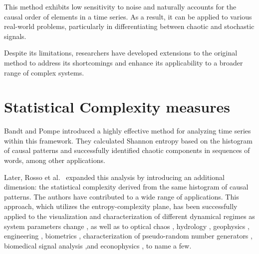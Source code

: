 This method exhibits low sensitivity to noise and naturally accounts for the causal order of elements in a time series. As a result, it can be applied to various real-world problems, particularly in differentiating between chaotic and stochastic signals.

Despite its limitations, researchers have developed extensions to the original method to address its shortcomings and enhance its applicability to a broader range of complex systems.

\section{Statistical Complexity measures} \label{Sec:BackgroundKnowledge}

Bandt and Pompe introduced a highly effective method for analyzing time series within this framework. They calculated Shannon entropy based on the histogram of causal patterns and successfully identified chaotic components in sequences of words, among other applications.

Later, Rosso et al.~\cite{EEGAnalysisUsingWaveletBasedInformationTools} expanded this analysis by introducing an additional dimension: the statistical complexity derived from the same histogram of causal patterns. The authors have contributed to a wide range of applications. This approach, which utilizes the entropy-complexity plane, has been successfully applied to the visualization and characterization of different dynamical regimes as system parameters change  \cite{Bandt2005,Cao2004,DeMicco2012a,Kowalski2007,Kowalski2011b,Rosso2010a,Zunino2010a,Zunino2012a}, as well as to optical chaos \cite{Liu2016f,Soriano2011a,Toomey2014,Yang2015e,Zunino2011a}, hydrology \cite{Lange2013,Serinaldi2014,Stosic2016}, geophysics \cite{Consolini2014,Saco2010,Sippel2016}, engineering \cite{Aquino2017,Aquino2015,Redelico2017a,Yan2012}, biometrics \cite{Rosso2016}, characterization of pseudo-random number generators \cite{DeMicco2008,DeMicco2009}, biomedical signal analysis \cite{Li2014b,Li2008b,Li2007,Liang2015b,Montani2015a,Montani2014,Montani2014a,Montani2015,Morabito2012,Parlitz2012,Perinelli2025,Perinelli2019,Zanin2012},and econophysics \cite{Bariviera2015a,Bariviera2015,Bariviera2016,Zanin2012,Zunino2016a,Zunino2009,Zunino2010}, to name a few.

